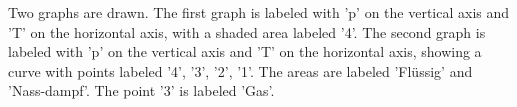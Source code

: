 Two graphs are drawn. The first graph is labeled with 'p' on the vertical axis and 'T' on the horizontal axis, with a shaded area labeled '4'. The second graph is labeled with 'p' on the vertical axis and 'T' on the horizontal axis, showing a curve with points labeled '4', '3', '2', '1'. The areas are labeled 'Flüssig' and 'Nass-dampf'. The point '3' is labeled 'Gas'.